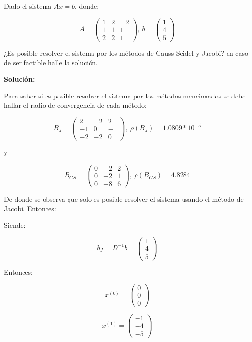 Dado el sistema $Ax=b$, donde:

$$
    A=\begin{pmatrix}
     1 &  2 & -2 \\
     1 &  1 &  1 \\
     2 &  2 &  1 
    \end{pmatrix},\ 
    b=\begin{pmatrix}
    1\\
    4\\
    5
    \end{pmatrix}
$$

¿Es posible resolver el sistema por los métodos de Gauss-Seidel y Jacobi? en caso de ser factible halle la solución.

\textbf{Solución:}

Para saber si es posible resolver el sistema por los métodos mencionados se debe hallar el radio de convergencia de cada método:

$$
    B_{J}=\begin{pmatrix}
     2 &  -2 & 2 \\
     -1 &  0 &  -1 \\
     -2 &  -2 &  0 
    \end{pmatrix},\ \rho(B_{J}) = 1.0809*10^{-5}
$$

y

$$
    B_{GS}=\begin{pmatrix}
     0 &  -2 & 2 \\
     0 &  -2 &  1 \\
     0 &  -8 &  6 
    \end{pmatrix},\ \rho(B_{GS}) = 4.8284
$$

De donde se observa que solo es posible resolver el sistema usando el método de Jacobi. Entonces:

Siendo:

$$
    b_{J}=D^{-1}b = \begin{pmatrix}
    1\\
    4\\
    5
    \end{pmatrix}
$$

Entonces:

$$
    x^{(0)}=\begin{pmatrix}
    0\\
    0\\
    0
    \end{pmatrix}
$$

$$
    x^{(1)}=\begin{pmatrix}
    -1\\
    -4\\
    -5
    \end{pmatrix}
$$

